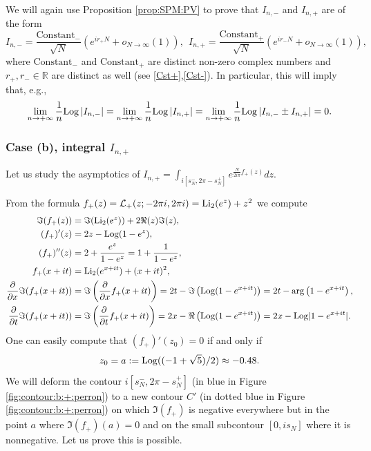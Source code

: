 \documentclass[11pt]{amsart}
\newcommand{\R}{\mathbb{R}}
\newcommand{\Log}{{\rm Log}}
\newcommand{\ra}{\rightarrow}
\begin{document}
{We will again use Proposition \ref{prop:SPM:PV} to prove that $I_{n,-}$ and $I_{n,+}$ are 
of the form
\begin{equation}\label{asyIjui25c}
I_{n,-} = \dfrac{\text{Constant}_-}{\sqrt{N}}(e^{i r_+ N}+o_{N\to\infty}(1)), \ \
I_{n,+} = \dfrac{\text{Constant}_+}{\sqrt{N}}(e^{i r_- N}+o_{N\to\infty}(1)),
\end{equation}
where $\text{Constant}_-$ and $\text{Constant}_+$ are distinct non-zero complex numbers and $r_+,r_-\in \R$ are distinct as well (see \eqref{Cst+},\eqref{Cst-}).
In particular, this will imply that, e.g.,
\begin{equation}\label{asyIjui25d}
\lim_{n\ra +\infty}  \dfrac{1}{n}\Log \left \vert I_{n,-} \right \vert =
\lim_{n\ra +\infty}  \dfrac{1}{n}\Log \left \vert I_{n,+} \right \vert = 
\lim_{n\ra +\infty}  \dfrac{1}{n}\Log \left \vert I_{n,-} \pm I_{n,+} \right \vert = 0.
\end{equation}

\subsubsection{Case (b), integral $I_{n,+}$}\label{sub:b:+:perron}
Let us study the asymptotics of $I_{n,+}=  \int_{i[s_N^-,2\pi-s_N^+]}  e^{\frac{N}{2i\pi} f_{+}(z)} dz$.

From the formula $f_+(z)=\mathcal{L}_+(z;-2\pi i,2\pi i) = {\rm Li}_2(e^{z})+z^2$
we compute
\begin{align*}\Im(f_+(z))&= \Im({\rm Li}_2(e^{z}))+2 \Re(z)\Im(z),\\
(f_+)'(z)& =2z- \Log(1-e^z),\\
(f_+)''(z)& =2 + \dfrac{e^z}{1-e^z} = 1 + \dfrac{1}{1-e^z},\\
f_+(x+it)& = {\rm Li}_2(e^{x+it})+(x+it)^2 ,\\
\dfrac{\partial}{\partial x} \Im (f_+(x+it)) & = \Im \left (\dfrac{\partial}{\partial x}f_+(x+it)\right ) = 2t - \Im \left (\Log(1-e^{x+it})\right )
= 2t - \arg\left (1-e^{x+it}\right ),\\
\dfrac{\partial}{\partial t} \Im (f_+(x+it)) & = \Im \left (\dfrac{\partial}{\partial t}f_+(x+it)\right ) = 2x - \Re \left (\Log(1-e^{x+it})\right )
= 2x - \Log \vert 1-e^{x+it} \vert.
\end{align*}
One can easily compute that $(f_+)'(z_0)=0$ if and only if 
$$z_0 = a:= \Log ((-1+\sqrt{5})/{2}) \approx -0.48.$$
We will deform the contour $i[s_N^-,2\pi-s_N^+]$ (in blue in Figure \ref{fig:contour:b:+:perron}) to a new contour $C'$ (in dotted blue in Figure \ref{fig:contour:b:+:perron}) on which $\Im(f_+)$ is negative everywhere but in the point $a$ where  $\Im(f_+)(a)=0$ and on the small subcontour $[0,is_N]$ where it is nonnegative. Let us prove this is possible.

}
\end{document}
